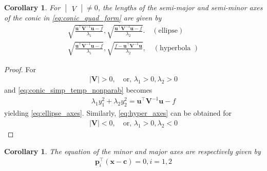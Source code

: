 \documentclass[]{interact}
\theoremstyle{plain}%
\newtheorem{corollary}[theorem]{Corollary}
\theoremstyle{definition}
\theoremstyle{remark}
\providecommand{\abs}[1]{\lvert#1\rvert}
\providecommand{\brak}[1]{\ensuremath{\left(#1\right)}}
\newcommand{\mydet}[1]{\ensuremath{\begin{vmatrix}#1\end{vmatrix}}}
\let\vec\mathbf
\begin{document}
\begin{corollary}
  For $\mydet{V} \ne 0$, the lengths of the semi-major and semi-minor axes of the conic in \eqref{eq:conic_quad_form} are given by 
  \begin{align} 
    \label{eq:ellipse_axes}
    \sqrt{\frac{\vec{u}^{\top}\vec{V}^{-1}\vec{u} -f}{\lambda_1}}, 
    \sqrt{\frac{\vec{u}^{\top}\vec{V}^{-1}\vec{u} -f}{\lambda_2}}. \quad \brak{\text{ellipse}}
    \\
%
       \sqrt{\frac{\vec{u}^{\top}\vec{V}^{-1}\vec{u} -f}{\lambda_1}}, 
       \sqrt{\frac{f-\vec{u}^{\top}\vec{V}^{-1}\vec{u}}{\lambda_2}}, \quad \brak{\text{hyperbola }}
%
  \label{eq:hyper_axes}
\end{align} 

\end{corollary}
\begin{proof}
  For \begin{align} \abs{\vec{V}} > 0, \quad \text{or, } \lambda_1 > 0, \lambda_2 > 0 
  \end{align} and \eqref{eq:conic_simp_temp_nonparab} becomes \begin{align} \lambda_1y_1^2 +\lambda_2y_2^2 = 
  \vec{u}^{\top}\vec{V}^{-1}\vec{u} -f \end{align} yielding        \eqref{eq:ellipse_axes}.  Similarly, \eqref{eq:hyper_axes} can be obtained for 
  \begin{align} 
    \label{eq:conic_hyper_cond}
    \abs{\vec{V}} 
    < 0, \quad \text{or, } \lambda_1 > 0, \lambda_2 < 0 \end{align}
\end{proof}
\begin{corollary}
  The equation of the minor and major  axes are respectively given by 
  \begin{align}
\vec{p}_i^{\top}\brak{\vec{x}-\vec{c}} = 0, i = 1,2
  \end{align}
\end{corollary}
%
\end{document}
